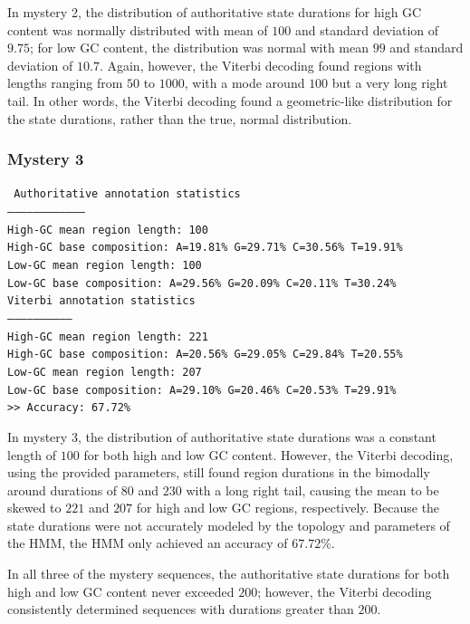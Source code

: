 \documentclass[a4paper]{article}
\begin{document}
In mystery 2, the distribution of authoritative state
durations for high GC content was normally distributed with 
mean of $100$ and standard deviation of $9.75$; for low GC content,
the distribution was normal with mean $99$ and standard deviation
of $10.7$. Again, however, the Viterbi decoding found regions
with lengths ranging from $50$ to $1000$, with a mode around $100$
but a very long right tail. In other words, the Viterbi decoding
found a geometric-like distribution for the state durations, rather
than the true, normal distribution.

\subsubsection*{Mystery 3}
{\tt
Authoritative annotation statistics\\
-----------------------------------\\
High-GC mean region length:  100\\
High-GC base composition: A=19.81\% G=29.71\% C=30.56\% T=19.91\%\\
Low-GC mean region length:  100\\
Low-GC base composition: A=29.56\% G=20.09\% C=20.11\% T=30.24\%\\

\noindent Viterbi annotation statistics\\
-----------------------------\\
High-GC mean region length:  221\\
High-GC base composition: A=20.56\% G=29.05\% C=29.84\% T=20.55\%\\
Low-GC mean region length:  207\\
Low-GC base composition: A=29.10\% G=20.46\% C=20.53\% T=29.91\%\\

\noindent >> Accuracy: 67.72\%\\
}

In mystery 3, the distribution of authoritative state durations was
a constant length of $100$ for both high and low GC content. However,
the Viterbi decoding, using the provided parameters, still found
region durations in the bimodally around durations of $80$ and $230$
with a long right tail, causing the mean to be skewed to $221$ and $207$
for high and low GC regions, respectively. Because the state durations
were not accurately modeled by the topology and parameters of the HMM,
the HMM only achieved an accuracy of $67.72\%$.

In all three of the mystery sequences, the authoritative
state durations for both high and low GC content never
exceeded $200$; however, the Viterbi decoding consistently
determined sequences with durations greater than $200$.
\end{document}
